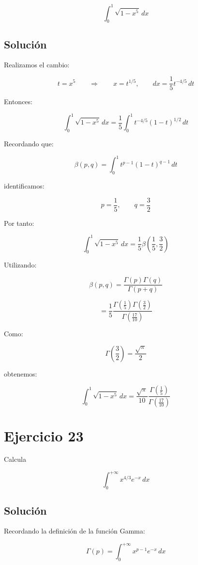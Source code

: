 \documentclass[fleqn]{article}
\begin{document}
	\[
	\int_0^1\sqrt{1-x^5}\,dx
	\]

	\subsection{Solución}

	Realizamos el cambio:

	\[
	t=x^5
	\qquad\Longrightarrow\qquad
	x=t^{1/5},
	\qquad
	dx=\frac{1}{5}t^{-4/5}\,dt
	\]

	Entonces:

	\[
	\int_0^1\sqrt{1-x^5}\,dx
	=
	\frac{1}{5}
	\int_0^1
	t^{-4/5}(1-t)^{1/2}\,dt
	\]

	Recordando que:

	\[
	\beta(p,q)
	=
	\int_0^1
	t^{p-1}(1-t)^{q-1}\,dt
	\]

	identificamos:

	\[
	p=\frac{1}{5},
	\qquad
	q=\frac{3}{2}
	\]

	Por tanto:

	\[
	\int_0^1\sqrt{1-x^5}\,dx
	=
	\frac{1}{5}
	\beta\left(\frac{1}{5},\frac{3}{2}\right)
	\]

	Utilizando:

	\[
	\beta(p,q)
	=
	\frac{\Gamma(p)\Gamma(q)}
	{\Gamma(p+q)}
	\]

	\[
	=
	\frac{1}{5}
	\frac{
	\Gamma\left(\frac{1}{5}\right)
	\Gamma\left(\frac{3}{2}\right)
	}{
	\Gamma\left(\frac{17}{10}\right)
	}
	\]

	Como:

	\[
	\Gamma\left(\frac{3}{2}\right)
	=
	\frac{\sqrt{\pi}}{2}
	\]

	obtenemos:

	\[
	\boxed{
	\int_0^1\sqrt{1-x^5}\,dx
	=
	\frac{\sqrt{\pi}}{10}
	\frac{
	\Gamma\left(\frac{1}{5}\right)
	}{
	\Gamma\left(\frac{17}{10}\right)
	}
	}
	\]

\section{Ejercicio 23}
	Calcula

	\[
	\int_0^{+\infty}x^{4/3}e^{-x}\,dx
	\]

	\subsection{Solución}

	Recordando la definición de la función Gamma:

	\[
	\Gamma(p)
	=
	\int_0^{+\infty}x^{p-1}e^{-x}\,dx
	\]
\end{document}
